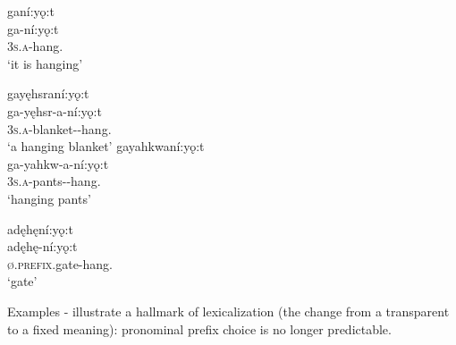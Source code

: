 \newpage
\ea\label{ex:exceptionpp3} 
\ea ganí:yǫ:t \\\label{ex:exceptionpp3a}
\gll ga-ní:yǫ:t\\
\textsc{3s.a}-hang.{\stative}\\
\glt ‘it is hanging’ 


\ex gayęhsraní:yǫ:t\\\label{ex:exceptionpp3b}
\gll ga-yęhsr-a-ní:yǫ:t\\
 \textsc{3s.a}-blanket-{\joinerA}-hang. {\stative}\\
\glt `a hanging blanket'
\ex gayahkwaní:yǫ:t\\\label{ex:exceptionpp3c}
\gll ga-yahkw-a-ní:yǫ:t\\
 \textsc{3s.a}-pants-{\joinerA}-hang. {\stative}\\
\glt `hanging pants'
 \z
 \z

 \ea\label{ex:exceptionpp300} 
adęhęní:yǫ:t\\\label{ex:exceptionpp3d}
\gll adęhę-ní:yǫ:t\\
 \textsc{ø.prefix}.gate-hang. {\stative}\\
\glt `gate'
\z


Examples - illustrate a hallmark of lexicalization (the change from a transparent to a fixed meaning): pronominal prefix choice is no longer predictable. 

